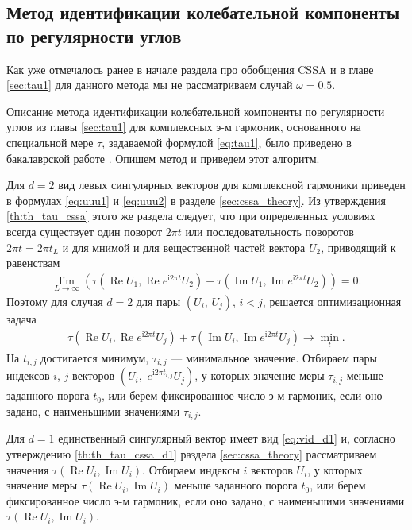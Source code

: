 \documentclass[specialist,
               substylefile = spbu.rtx,
               subf,href,colorlinks=true, 12pt]{disser}
\def\RE{\mathop{\mathrm{Re}}}
\def\IM{\mathop{\mathrm{Im}}}
\newcommand{\I}{\mathrm{i}}
\begin{document}
\subsection{Метод идентификации колебательной компоненты по регулярности углов}
\label{sec:tau_cssa}
Как уже отмечалось ранее в начале раздела про обобщения CSSA и в главе \ref{sec:tau1} для данного метода мы не рассматриваем случай $\omega=0.5$.

Описание метода идентификации колебательной компоненты по регулярности углов из главы \ref{sec:tau1} для комплексных э-м гармоник, основанного на специальной мере $\tau$, задаваемой формулой \eqref{eq:tau1}, было приведено в бакалаврской работе \cite{Zhornikova2016}. Опишем метод и приведем этот алгоритм.

Для $d=2$ вид левых сингулярных векторов для комплексной гармоники приведен в формулах \ref{eq:uuu1} и \eqref{eq:uuu2} в разделе \eqref{sec:cssa_theory}.
Из утверждения \ref{th:th_tau_cssa} этого же раздела следует, что при определенных условиях всегда существует один поворот $2\pi t$ или последовательность поворотов $2\pi t = 2\pi t_L$ и для мнимой и для вещественной частей вектора $U_2$, приводящий к равенствам
\begin{gather*}
\lim_{L \rightarrow \infty}(\tau (\RE U_1, \RE e^{\I 2\pi t} U_2) + \tau (\IM U_1, \IM e^{\I 2\pi t} U_2))= 0.
\end{gather*}
Поэтому для случая $d=2$ для пары $(U_i,\,U_j)$, $i<j$, решается оптимизационная задача
\begin{gather} \label{eq:cssa_tau_opt}
 \tau(\RE U_i, \RE e^{\I 2\pi t} U_j) + \tau(\IM U_i, \IM e^{\I 2\pi t} U_j) \longrightarrow \min_{t}.
\end{gather}
На $t_{i,j}$ достигается минимум, $\tau_{i,j}$ --- минимальное значение.
Отбираем пары индексов $i$, $j$ векторов $\left(U_i, \,\,e^{\mathrm{i} 2\pi t_{i,j}}U_j\right)$, у которых значение меры $\tau_{i,j}$
меньше заданного порога $t_0$, или берем фиксированное число э-м гармоник, если оно задано, с наименьшими значениями $\tau_{i,j}$.

Для $d=1$ единственный сингулярный вектор имеет вид \eqref{eq:vid_d1} и, согласно  утверждению \ref{th:th_tau_cssa_d1} раздела \ref{sec:cssa_theory} рассматриваем значения $\tau(\RE U_i, \IM U_i)$.
Отбираем индексы $i$ векторов $U_i$, у которых значение меры $\tau(\RE U_i, \IM U_i)$
меньше заданного порога $t_0$,
или берем фиксированное число э-м гармоник, если оно задано, с наименьшими значениями $\tau(\RE U_i, \IM U_i)$.
\end{document}
